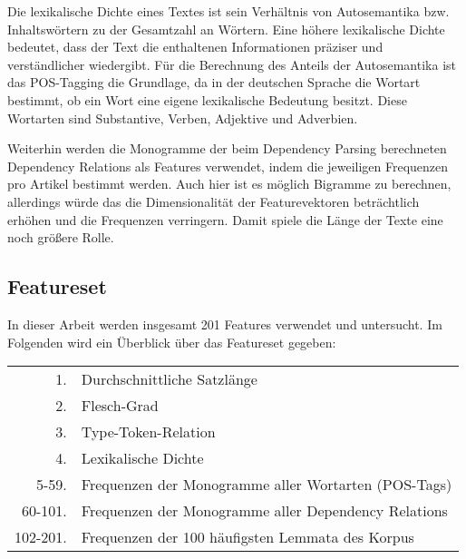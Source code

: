 Die lexikalische Dichte eines Textes ist sein Verhältnis von Autosemantika bzw. Inhaltswörtern zu der Gesamtzahl an Wörtern. Eine höhere lexikalische Dichte bedeutet, dass der Text die enthaltenen Informationen präziser und verständlicher wiedergibt. Für die Berechnung des Anteils der Autosemantika ist das POS-Tagging die Grundlage, da in der deutschen Sprache die Wortart bestimmt, ob ein Wort eine eigene lexikalische Bedeutung besitzt. Diese Wortarten sind Substantive, Verben, Adjektive und Adverbien.

Weiterhin werden die Monogramme der beim Dependency Parsing berechneten Dependency Relations als Features verwendet, indem die jeweiligen Frequenzen pro Artikel bestimmt werden. Auch hier ist es möglich Bigramme zu berechnen, allerdings würde das die Dimensionalität der Featurevektoren beträchtlich erhöhen und die Frequenzen verringern. Damit spiele die Länge der Texte eine noch größere Rolle.

\subsection{Featureset}
In dieser Arbeit werden insgesamt 201 Features verwendet und untersucht. Im Folgenden wird ein Überblick über das Featureset gegeben:

\begin{tabular}{rl}
  1. & Durchschnittliche Satzlänge\\
  2. & Flesch-Grad\\
  3. & Type-Token-Relation\\
  4. & Lexikalische Dichte\\
  5-59. & Frequenzen der Monogramme aller Wortarten (POS-Tags)\\
  60-101. & Frequenzen der Monogramme aller Dependency Relations\\
  102-201. & Frequenzen der 100 häufigsten Lemmata des Korpus
\end{tabular}

